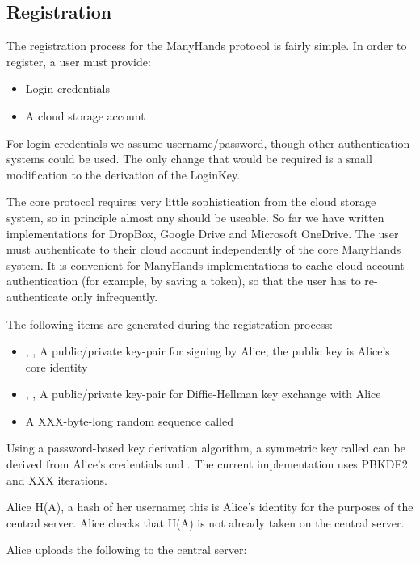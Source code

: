 \documentclass[pldi,10pt,preprint]{sigplanconf-pldi16}
\begin{document}
\subsection{Registration}

The registration process for the ManyHands protocol is fairly simple.
In order to register, a user must provide:

\begin{itemize}
\item Login credentials
\item A cloud storage account
\end{itemize}

For login credentials we assume username/password, though other authentication systems could be used.
The only change that would be required is a small modification to the derivation of the LoginKey.

The core protocol requires very little sophistication from the cloud storage system, so in principle almost any should be useable.
So far we have written implementations for DropBox, Google Drive and Microsoft OneDrive.
The user must authenticate to their cloud account independently of the core ManyHands system.
It is convenient for ManyHands implementations to cache cloud account authentication (for example, by saving a token), so that the user has to re-authenticate only infrequently.

The following items are generated during the registration process:

\begin{itemize}
\item {}, , A public/private key-pair for signing by Alice; the public key is Alice's core identity
\item {}, , A public/private key-pair for Diffie-Hellman key exchange with Alice
\item A XXX-byte-long random sequence called 
\end{itemize}

Using a password-based key derivation algorithm, a symmetric key called  can be derived from Alice's credentials and .
The current implementation uses PBKDF2 and XXX iterations.

Alice H(A), a hash of her username; this is Alice's identity for the purposes of the central server.
Alice checks that H(A) is not already taken on the central server.

Alice uploads the following to the central server:
\end{document}
